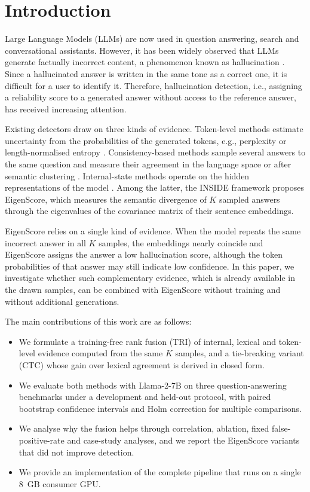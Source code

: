 \documentclass[10pt]{article}
\begin{document}
\section{Introduction}
Large Language Models (LLMs) are now used in question answering, search and conversational assistants. However, it has been widely observed that LLMs generate factually incorrect content, a phenomenon known as hallucination \citep{farquhar2024}. Since a hallucinated answer is written in the same tone as a correct one, it is difficult for a user to identify it. Therefore, hallucination detection, i.e., assigning a reliability score to a generated answer without access to the reference answer, has received increasing attention.

Existing detectors draw on three kinds of evidence. Token-level methods estimate uncertainty from the probabilities of the generated tokens, e.g., perplexity or length-normalised entropy \citep{malinin2021}. Consistency-based methods sample several answers to the same question and measure their agreement in the language space \citep{lin2023generating,manakul2023} or after semantic clustering \citep{kuhn2023,farquhar2024}. Internal-state methods operate on the hidden representations of the model \citep{chen2024inside,sriramanan2024}. Among the latter, the INSIDE framework \citep{chen2024inside} proposes EigenScore, which measures the semantic divergence of $K$ sampled answers through the eigenvalues of the covariance matrix of their sentence embeddings.

EigenScore relies on a single kind of evidence. When the model repeats the same incorrect answer in all $K$ samples, the embeddings nearly coincide and EigenScore assigns the answer a low hallucination score, although the token probabilities of that answer may still indicate low confidence. In this paper, we investigate whether such complementary evidence, which is already available in the drawn samples, can be combined with EigenScore without training and without additional generations.

The main contributions of this work are as follows:
\begin{itemize}
\item We formulate a training-free rank fusion (TRI) of internal, lexical and token-level evidence computed from the same $K$ samples, and a tie-breaking variant (CTC) whose gain over lexical agreement is derived in closed form.
\item We evaluate both methods with Llama-2-7B on three question-answering benchmarks under a development and held-out protocol, with paired bootstrap confidence intervals and Holm correction for multiple comparisons.
\item We analyse why the fusion helps through correlation, ablation, fixed false-positive-rate and case-study analyses, and we report the EigenScore variants that did not improve detection.
\item We provide an implementation of the complete pipeline that runs on a single 8~GB consumer GPU.
\end{itemize}
\end{document}
